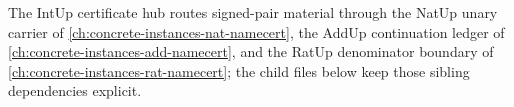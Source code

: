 The IntUp certificate hub routes signed-pair material through the NatUp unary carrier of \autoref{ch:concrete-instances-nat-namecert}, the AddUp continuation ledger of \autoref{ch:concrete-instances-add-namecert}, and the RatUp denominator boundary of \autoref{ch:concrete-instances-rat-namecert}; the child files below keep those sibling dependencies explicit.
